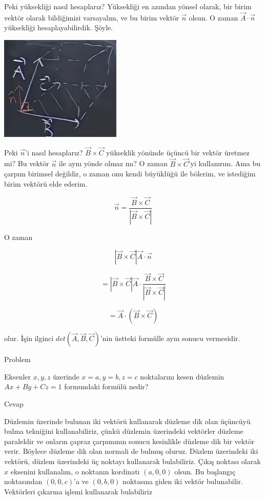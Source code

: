 \documentclass[12pt,fleqn]{article}\usepackage{../../common}
\begin{document}
Peki yüksekliği nasıl hesaplarız? Yüksekliği en azından yönsel olarak, bir birim
vektör olarak bildiğimizi varsayalım, ve bu birim vektör $\vec{n}$ olsun. O
zaman $\vec{A}\cdot\vec{n}$ yüksekliği hesaplayabilirdik. Şöyle.

\includegraphics[height=5cm]{2_14.png}

Peki $\vec{n}$'i nasıl hesaplarız?  $\vec{B}\times \vec{C}$ yükseklik yönünde
üçüncü bir vektör üretmez mi? Bu vektör $\vec{n}$ ile aynı yönde olmaz mı? O
zaman $\vec{B}\times \vec{C}$'yi kullanırım. Ama bu çarpım birimsel değildir, o
zaman onu kendi büyüklüğü ile bölerim, ve istediğim birim vektörü elde ederim.

$$ \vec{n} = \frac{\vec{B}\times \vec{C}}{|\vec{B}\times \vec{C}|} $$

O zaman

$$ |\vec{B}\times \vec{C}| \vec{A}\cdot\vec{n} $$

$$  = |\vec{B}\times \vec{C}| \vec{A}\cdot \frac{\vec{B}\times 
\vec{C}}{|\vec{B}\times \vec{C}|}  $$

$$  = \vec{A}\cdot (\vec{B}\times \vec{C})  $$

olur. İşin ilginci $det(\vec{A},\vec{B},\vec{C})$'nin üstteki formülle 
aynı sonucu vermesidir. 

Problem

Eksenler $x,y,z$ üzerinde $x=a,y=b,z=c$ noktalarını kesen düzlemin
$Ax+By+Cz=1$ formundaki formülü nedir?

Cevap

Düzlemin üzerinde bulunan iki vektörü kullanarak düzleme dik olan üçüncüyü bulma
tekniğini kullanabiliriz, çünkü düzlemin üzerindeki vektörler düzleme paraleldir
ve onların çapraz çarpımının sonucu kesinlikle düzleme dik bir vektör verir.
Böylece düzleme dik olan normali de bulmuş oluruz. Düzlem üzerindeki iki
vektörü, düzlem üzerindeki üç noktayı kullanarak bulabiliriz. Çıkış noktası
olarak $x$ eksenini kullanalım, o noktanın kordinatı $(a,0,0)$ olsun. Bu
başlangıç noktasından $(0,0,c)$'a ve $(0,b,0)$ noktasına giden iki vektör
bulunabilir. Vektörleri çıkarma işlemi kullanarak bulabiliriz
\end{document}
